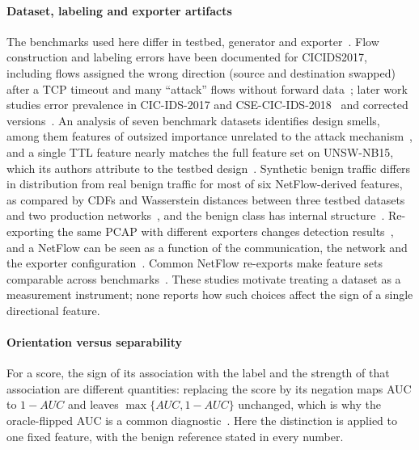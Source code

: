 \documentclass[preprint,12pt]{elsarticle}
\begin{document}
\paragraph{Dataset, labeling and exporter artifacts} The benchmarks used here differ in testbed, generator and exporter~\cite{sharafaldin2018cicids,moustafa2015unsw,koroniotis2019botiot}. Flow construction and labeling errors have been documented for CICIDS2017, including flows assigned the wrong direction (source and destination swapped) after a TCP timeout and many ``attack'' flows without forward data~\cite{engelen2021troubleshooting}; later work studies error prevalence in CIC-IDS-2017 and CSE-CIC-IDS-2018~\cite{liu2022errorprevalence} and corrected versions~\cite{lanvin2023errors}. An analysis of seven benchmark datasets identifies design smells, among them features of outsized importance unrelated to the attack mechanism~\cite{flood2024smells}, and a single TTL feature nearly matches the full feature set on UNSW-NB15, which its authors attribute to the testbed design~\cite{sarhan2021featureanalysis}. Synthetic benign traffic differs in distribution from real benign traffic for most of six NetFlow-derived features, as compared by CDFs and Wasserstein distances between three testbed datasets and two production networks~\cite{layeghy2024benchmarking}, and the benign class has internal structure~\cite{wilkinson2025normal}. Re-exporting the same PCAP with different exporters changes detection results~\cite{pinto2024flowexporter}, and a NetFlow can be seen as a function of the communication, the network and the exporter configuration~\cite{apruzzese2022cross}. Common NetFlow re-exports make feature sets comparable across benchmarks~\cite{sarhan2021netflow,sarhan2021nfv2}. These studies motivate treating a dataset as a measurement instrument; none reports how such choices affect the sign of a single directional feature.

\paragraph{Orientation versus separability} For a score, the sign of its association with the label and the strength of that association are different quantities: replacing the score by its negation maps AUC to $1-AUC$ and leaves $\max\{AUC,1-AUC\}$ unchanged, which is why the oracle-flipped AUC is a common diagnostic~\cite{jin2026benchmark}. Here the distinction is applied to one fixed feature, with the benign reference stated in every number.
\end{document}
